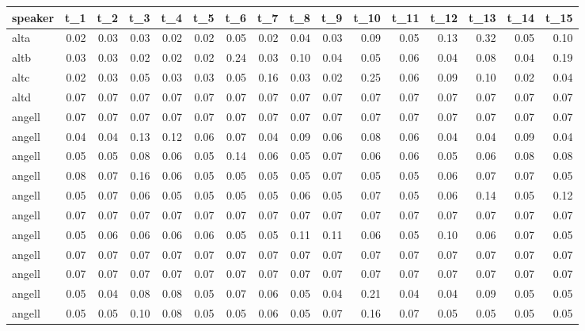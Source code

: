 \begin{tabular}{lrrrrrrrrrrrrrrr}
\toprule
   speaker &  t\_1 &  t\_2 &  t\_3 &  t\_4 &  t\_5 &  t\_6 &  t\_7 &  t\_8 &  t\_9 &  t\_10 &  t\_11 &  t\_12 &  t\_13 &  t\_14 &  t\_15 \\
\midrule
      alta & 0.02 & 0.03 & 0.03 & 0.02 & 0.02 & 0.05 & 0.02 & 0.04 & 0.03 &  0.09 &  0.05 &  0.13 &  0.32 &  0.05 &  0.10 \\
      altb & 0.03 & 0.03 & 0.02 & 0.02 & 0.02 & 0.24 & 0.03 & 0.10 & 0.04 &  0.05 &  0.06 &  0.04 &  0.08 &  0.04 &  0.19 \\
      altc & 0.02 & 0.03 & 0.05 & 0.03 & 0.03 & 0.05 & 0.16 & 0.03 & 0.02 &  0.25 &  0.06 &  0.09 &  0.10 &  0.02 &  0.04 \\
      altd & 0.07 & 0.07 & 0.07 & 0.07 & 0.07 & 0.07 & 0.07 & 0.07 & 0.07 &  0.07 &  0.07 &  0.07 &  0.07 &  0.07 &  0.07 \\
    angell & 0.07 & 0.07 & 0.07 & 0.07 & 0.07 & 0.07 & 0.07 & 0.07 & 0.07 &  0.07 &  0.07 &  0.07 &  0.07 &  0.07 &  0.07 \\
    angell & 0.04 & 0.04 & 0.13 & 0.12 & 0.06 & 0.07 & 0.04 & 0.09 & 0.06 &  0.08 &  0.06 &  0.04 &  0.04 &  0.09 &  0.04 \\
    angell & 0.05 & 0.05 & 0.08 & 0.06 & 0.05 & 0.14 & 0.06 & 0.05 & 0.07 &  0.06 &  0.06 &  0.05 &  0.06 &  0.08 &  0.08 \\
    angell & 0.08 & 0.07 & 0.16 & 0.06 & 0.05 & 0.05 & 0.05 & 0.05 & 0.07 &  0.05 &  0.05 &  0.06 &  0.07 &  0.07 &  0.05 \\
    angell & 0.05 & 0.07 & 0.06 & 0.05 & 0.05 & 0.05 & 0.05 & 0.06 & 0.05 &  0.07 &  0.05 &  0.06 &  0.14 &  0.05 &  0.12 \\
    angell & 0.07 & 0.07 & 0.07 & 0.07 & 0.07 & 0.07 & 0.07 & 0.07 & 0.07 &  0.07 &  0.07 &  0.07 &  0.07 &  0.07 &  0.07 \\
    angell & 0.05 & 0.06 & 0.06 & 0.06 & 0.06 & 0.05 & 0.05 & 0.11 & 0.11 &  0.06 &  0.05 &  0.10 &  0.06 &  0.07 &  0.05 \\
    angell & 0.07 & 0.07 & 0.07 & 0.07 & 0.07 & 0.07 & 0.07 & 0.07 & 0.07 &  0.07 &  0.07 &  0.07 &  0.07 &  0.07 &  0.07 \\
    angell & 0.07 & 0.07 & 0.07 & 0.07 & 0.07 & 0.07 & 0.07 & 0.07 & 0.07 &  0.07 &  0.07 &  0.07 &  0.07 &  0.07 &  0.07 \\
    angell & 0.05 & 0.04 & 0.08 & 0.08 & 0.05 & 0.07 & 0.06 & 0.05 & 0.04 &  0.21 &  0.04 &  0.04 &  0.09 &  0.05 &  0.05 \\
    angell & 0.05 & 0.05 & 0.10 & 0.08 & 0.05 & 0.05 & 0.06 & 0.05 & 0.07 &  0.16 &  0.07 &  0.05 &  0.05 &  0.05 &  0.05 \\

\end{tabular}
